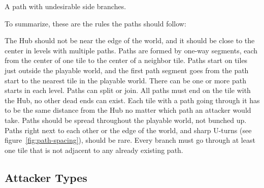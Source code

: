 \begin{center}
    \captionsetup{type=figure}
    \caption{A path with undesirable side branches.}
    \label{fig:bad-path-splits}
\end{center}

To summarize, these are the rules the paths should follow:
\reqreset
\begin{itemize}
     The Hub should not be near the edge of the world, and it should be close to the center in levels with multiple paths.
     Paths are formed by one-way segments, each from the center of one tile to the center of a neighbor tile.
     Paths start on tiles just outside the playable world, and the first path segment goes from the path start to the nearest tile in the playable world.
     There can be one or more path starts in each level.
     Paths can split or join.
     All paths must end on the tile with the Hub, no other dead ends can exist.
     Each tile with a path going through it has to be the same distance from the Hub no matter which path an attacker would take.
     Paths should be spread throughout the playable world, not bunched up.
     Paths right next to each other or the edge of the world, and sharp U-turns (see figure~\ref{fig:path-spacing}), should be rare.
     Every branch must go through at least one tile that is not adjacent to any already existing path.
\end{itemize}

\subsection{Attacker Types}\label{sec:attacker-types}

